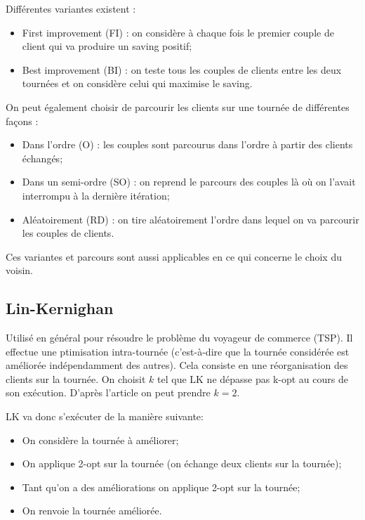\documentclass[a4paper,11pt]{article}%
\begin{document}
Différentes variantes existent :
\begin{itemize}
\item First improvement (FI) : on considère à chaque fois le premier couple de client qui va produire un saving positif;
\item Best improvement (BI) : on teste tous les couples de clients entre les deux tournées et on considère celui qui maximise le saving. \\
\end{itemize}

On peut également choisir de parcourir les clients sur une tournée de différentes façons :
\begin{itemize}
\item Dans l'ordre (O) : les couples sont parcourus dans l'ordre à partir des clients échangés;
\item Dans un semi-ordre (SO) : on reprend le parcours des couples là où on l'avait interrompu à la dernière itération;
\item Aléatoirement (RD) : on tire aléatoirement l'ordre dans lequel on va parcourir les couples de clients. \\
\end{itemize}

Ces variantes et parcours sont aussi applicables en ce qui concerne le choix du voisin.

\subsection*{Lin-Kernighan}

Utilisé en général pour résoudre le problème du voyageur de commerce (TSP). Il effectue une ptimisation intra-tournée (c'est-à-dire que la tournée considérée est améliorée indépendamment des autres). Cela consiste en une réorganisation des clients sur la tournée. On choisit $k$ tel que LK ne dépasse pas k-opt au cours de son exécution. D'après l'article on peut prendre $k = 2$.

LK va donc s'exécuter de la manière suivante:
\begin{itemize}
\item On considère la tournée à améliorer;
\item On applique 2-opt sur la tournée (on échange deux clients sur la tournée);
\item Tant qu'on a des améliorations on applique 2-opt sur la tournée;
\item On renvoie la tournée améliorée. \\
\end{itemize}
\end{document}
